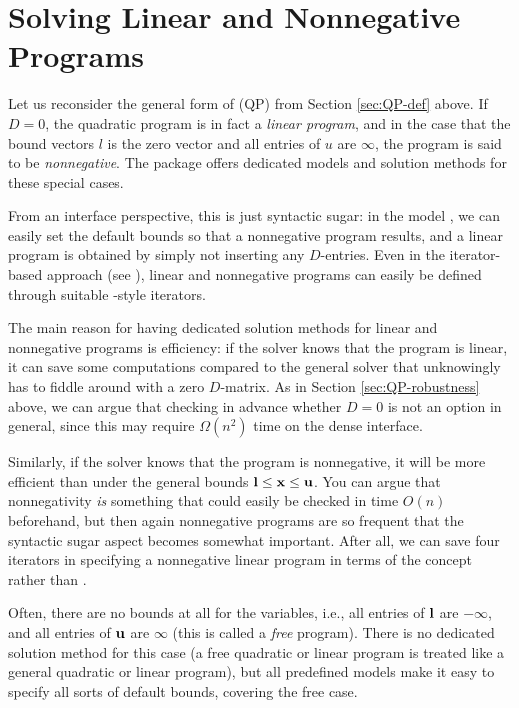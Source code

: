 \section{Solving Linear and Nonnegative Programs\label{sec:QP-lp}}
Let us reconsider the general form of (QP) from Section \ref{sec:QP-def} 
above. If $D=0$, the quadratic program is in fact a \emph{linear program},
and in the case that the bound vectors $l$ is the zero vector and all 
entries of $u$ are $\infty$, the program is said to be \emph{nonnegative}. 
The package offers dedicated models and solution methods for these special
cases.

From an interface perspective, this is just syntactic sugar: in the 
model , we can easily set the default bounds 
so that a nonnegative program results, and a linear program is
obtained by simply not inserting any $D$-entries. Even in the
iterator-based approach (see 
), linear
and nonnegative programs can easily be defined through suitable 
-style iterators.

The main reason for having dedicated solution methods for linear and
nonnegative programs is efficiency: if the solver knows that the program
is linear, it can save some computations compared to the general solver
that unknowingly has to fiddle around with a zero $D$-matrix. As in
Section \ref{sec:QP-robustness} above, we can argue that checking in
advance whether $D=0$ is not an option in general, since this may require 
$\Omega(n^2)$ time on the dense interface.

Similarly, if the solver knows that the program is nonnegative, it
will be more efficient than under the general bounds 
$\mathbf{l}\leq \mathbf{x} \leq \mathbf{u}$.
You can argue that nonnegativity \emph{is} something that could easily
be checked in time $O(n)$ beforehand, but then again nonnegative
programs are so frequent that the syntactic sugar aspect becomes
somewhat important. After all, we can save four iterators in 
specifying a nonnegative linear program in terms of the concept 
 rather than 
.

Often, there are no bounds at all for the variables, i.e., all entries
of $\mathbf{l}$ are $-\infty$, and all entries of $\mathbf{u}$ 
are $\infty$ (this is
called a \emph{free} program). There is no dedicated solution method
for this case (a free quadratic or linear program is treated like a
general quadratic or linear program), but all predefined models make
it easy to specify all sorts of default bounds, covering the free 
case.

